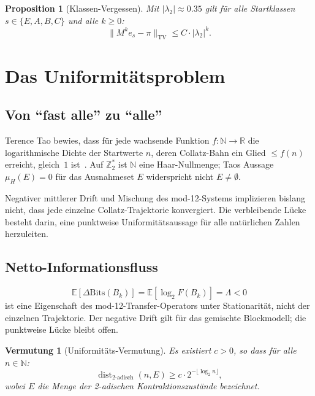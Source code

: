 \documentclass[12pt,a4paper]{article}
\newtheorem{proposition}[satz]{Proposition}
\newtheorem{vermutung}[satz]{Vermutung}
\newcommand{\N}{\mathbb{N}}
\newcommand{\R}{\mathbb{R}}
\newcommand{\Ztwo}{\mathbb{Z}_2}
\newcommand{\TV}{\mathrm{TV}}
\newcommand{\Lam}{\Lambda}
\newcommand{\disttwo}{\operatorname{dist}_{2\text{-adisch}}}
\begin{document}
\begin{proposition}[Klassen-Vergessen]
Mit $|\lambda_2| \approx 0.35$ gilt für alle Startklassen $s \in \{E,A,B,C\}$
und alle $k \geq 0$:
\[
  \|M^k e_s - \pi\|_{\TV} \leq C \cdot |\lambda_2|^k.
\]
\end{proposition}

\section{Das Uniformitätsproblem}
\label{sec:uniformitaet}

\subsection{Von ``fast alle'' zu ``alle''}

Terence Tao bewies, dass für jede wachsende Funktion $f:\N\to\R$ die
logarithmische Dichte der Startwerte $n$, deren Collatz-Bahn ein Glied
$\leq f(n)$ erreicht, gleich~$1$ ist~\cite{Tao2019}. Auf $\Ztwo^*$ ist
$\N$ eine Haar-Nullmenge; Taos Aussage $\mu_H(E)=0$ für das Ausnahmeset
$E$ widerspricht nicht $E \neq \emptyset$.

\begin{tcolorbox}[kern,
title={Zentrale offene Frage}]
Negativer mittlerer Drift
und
Mischung des mod-12-Systems
implizieren bislang nicht,
dass jede einzelne Collatz-Trajektorie
konvergiert.
Die verbleibende Lücke besteht darin,
eine punktweise Uniformitätsaussage
für alle natürlichen Zahlen herzuleiten.
\end{tcolorbox}

\subsection{Netto-Informationsfluss}

\begin{tcolorbox}[heuristik,title={Operatoreigenschaft vs.\ Trajektorie}]
\[
  \mathbb{E}[\Delta\text{Bits}(B_k)] = \mathbb{E}[\log_2 F(B_k)] = \Lam < 0
\]
ist eine Eigenschaft des mod-12-Transfer-Operators unter Stationarität,
nicht der einzelnen Trajektorie. Der negative Drift gilt für das
gemischte Blockmodell; die punktweise Lücke bleibt offen.
\end{tcolorbox}

\begin{vermutung}[Uniformitäts-Vermutung]
\label{verm:uniform}
Es existiert $c > 0$, so dass für alle $n \in \N$:
\[
  \disttwo(n, E) \geq c \cdot 2^{-\lfloor\log_2 n\rfloor},
\]
wobei $E$ die Menge der 2-adischen Kontraktionszustände bezeichnet.
\end{vermutung}
\end{document}
